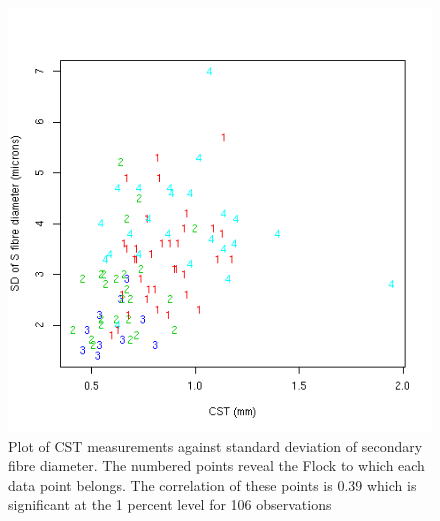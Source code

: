 %

\begin{figure}[!h]
  \centering
  \includegraphics[width=1.0\textwidth]{cstdssd.png}
  \caption{Plot of CST measurements against standard deviation of secondary fibre diameter. The numbered points reveal the Flock to which each data point belongs. The correlation of these points is 0.39 which is significant at the 1 percent level for 106 observations}
  \label{fig:cstdssd}
\end{figure}

%

